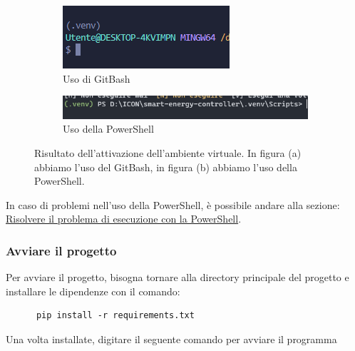 \documentclass[12pt, letterpaper]{article}
\begin{document}
\begin{figure}[h]
      \centering

      \vspace{0.2cm}

      \begin{subfigure}{1\textwidth}
            \centering
            \includegraphics{terminale-bash.png}
            \caption{Uso di GitBash}
      \end{subfigure}

      \vspace{0.3cm}


      \begin{subfigure}{1\textwidth}
            \centering
            \includegraphics[scale=0.8]{terminale-powershell.png}
            \caption{Uso della PowerShell}
      \end{subfigure}

      \caption{
            Risultato dell'attivazione dell'ambiente virtuale. In figura (a) abbiamo
            l'uso del GitBash, in figura (b) abbiamo l'uso della PowerShell.
      }
\end{figure} \break

\noindent In caso di problemi nell'uso della PowerShell, è possibile andare alla
sezione: \hyperref[sec:powershell-error]{Risolvere il problema di esecuzione con la PowerShell}. \\

\subsubsection{Avviare il progetto}

Per avviare il progetto, bisogna tornare alla directory principale del progetto e installare
le dipendenze con il comando: \\

\begin{verbatim}
      pip install -r requirements.txt
\end{verbatim}

\noindent Una volta installate, digitare il seguente comando per avviare il programma
\end{document}
